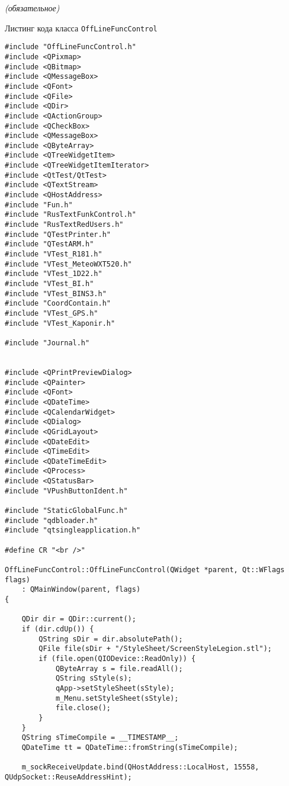 \label{sec:appendix_a}


\begin{center}
	\normalfont\normalsize{\textit{(обязательное)}}

	\normalfont\normalsize{Листинг кода класса \texttt{OffLineFuncControl}}
\end{center}


\begin{verbatim}
#include "OffLineFuncControl.h"
#include <QPixmap>
#include <QBitmap>
#include <QMessageBox>
#include <QFont>
#include <QFile>
#include <QDir>
#include <QActionGroup>
#include <QCheckBox>
#include <QMessageBox>
#include <QByteArray>
#include <QTreeWidgetItem>
#include <QTreeWidgetItemIterator>
#include <QtTest/QtTest>
#include <QTextStream>
#include <QHostAddress>
#include "Fun.h"
#include "RusTextFunkControl.h"
#include "RusTextRedUsers.h"
#include "QTestPrinter.h"
#include "QTestARM.h"
#include "VTest_R181.h"
#include "VTest_MeteoWXT520.h"
#include "VTest_1D22.h"
#include "VTest_BI.h"
#include "VTest_BINS3.h"
#include "CoordContain.h"
#include "VTest_GPS.h"
#include "VTest_Kaponir.h"

#include "Journal.h"


#include <QPrintPreviewDialog>
#include <QPainter>
#include <QFont>
#include <QDateTime>
#include <QCalendarWidget>
#include <QDialog>
#include <QGridLayout>
#include <QDateEdit>
#include <QTimeEdit>
#include <QDateTimeEdit>
#include <QProcess>
#include <QStatusBar>
#include "VPushButtonIdent.h"

#include "StaticGlobalFunc.h"
#include "qdbloader.h"
#include "qtsingleapplication.h"

#define CR "<br />"

OffLineFuncControl::OffLineFuncControl(QWidget *parent, Qt::WFlags flags)
	: QMainWindow(parent, flags)
{

	QDir dir = QDir::current();
	if (dir.cdUp()) {
		QString sDir = dir.absolutePath();
		QFile file(sDir + "/StyleSheet/ScreenStyleLegion.stl");
		if (file.open(QIODevice::ReadOnly)) {
			QByteArray s = file.readAll();
			QString sStyle(s);
			qApp->setStyleSheet(sStyle);
			m_Menu.setStyleSheet(sStyle);
			file.close();
		}
	}
	QString sTimeCompile = __TIMESTAMP__;
	QDateTime tt = QDateTime::fromString(sTimeCompile);

	m_sockReceiveUpdate.bind(QHostAddress::LocalHost, 15558, QUdpSocket::ReuseAddressHint);


\end{verbatim}
